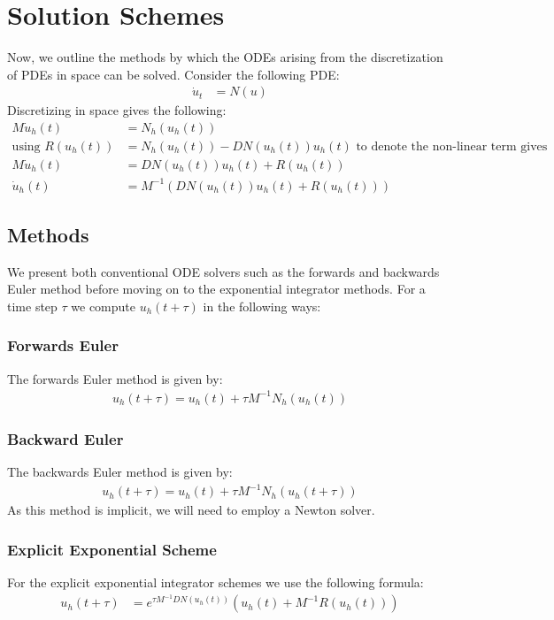 \section{Solution Schemes} \label{section:methods}
Now, we outline the methods by which the ODEs arising from the discretization of PDEs in space can be solved. 
Consider the following PDE:
\begin{align*}
    \dot u_t &= N(u)
\end{align*}
Discretizing in space gives the following:
\begin{align*}
M\dot u_h(t) &= N_h(u_h(t))\\ %
\text{using } R(u_h(t)) &= N_h(u_h(t)) - DN(u_h(t))u_h(t) \text{ to denote the non-linear term gives}\\
M\dot u_h(t) &= DN(u_h(t))u_h(t) + R(u_h(t))\\
\dot u_h(t) &= M^{-1}(DN(u_h(t))u_h(t) + R(u_h(t)))
\end{align*}
\subsection{Methods}
We present both conventional ODE solvers such as the forwards and backwards Euler method before moving on to the exponential integrator methods.
For a time step $\tau$ we compute $u_h(t+\tau)$ in the following ways: 

\subsubsection{Forwards Euler}
The forwards Euler method is given by:
\begin{align*}
u_h(t+\tau) = u_h(t) + \tau M^{-1}N_h(u_h(t))
\end{align*}

\subsubsection{Backward Euler}
The backwards Euler method is given by:
\begin{align*}
u_h(t+\tau) = u_h(t) + \tau M^{-1}N_h(u_h(t+\tau))
\end{align*}
As this method is implicit, we will need to employ a Newton solver.

\subsubsection{Explicit Exponential Scheme} %
For the explicit exponential integrator schemes we use the following formula:
\begin{align*}
u_h(t+\tau) &= e^{\tau M^{-1} DN(u_h(t))}(u_h(t) + M^{-1}R(u_h(t)))
\end{align*}



